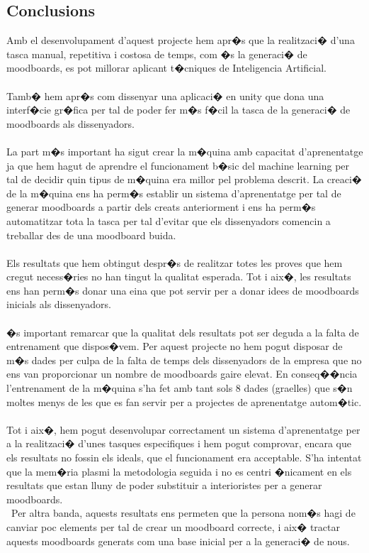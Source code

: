 \documentclass[12pt,a4paper,openright,oneside]{article}
\numberwithin{equation}{section}
\theoremstyle{definition}
\begin{document}
\subsection{Conclusions}
Amb el desenvolupament d'aquest projecte hem apr�s que la realitzaci� d'una tasca manual, repetitiva i costosa de temps, com �s la generaci� de moodboards, es pot millorar aplicant t�cniques de Inteligencia Artificial.\\\\
Tamb� hem apr�s com dissenyar una aplicaci� en unity que dona una interf�cie gr�fica per tal de poder fer m�s f�cil la tasca de la generaci� de moodboards als dissenyadors. \\\\
La part m�s important ha sigut crear la m�quina amb capacitat d'aprenentatge ja que hem hagut de aprendre el funcionament b�sic del machine learning per tal de decidir quin tipus de m�quina era millor pel problema descrit. La creaci� de la m�quina ens ha perm�s establir un sistema d'aprenentatge per tal de generar moodboards a partir dels creats anteriorment i ens ha perm�s automatitzar tota la tasca per tal d'evitar que els dissenyadors comencin a treballar des de una moodboard buida.\\\\
Els resultats que hem obtingut despr�s de realitzar totes les proves que hem cregut necess�ries no han tingut la qualitat esperada. Tot i aix�, les resultats ens han perm�s  donar una eina que pot servir per a donar idees de moodboards inicials als dissenyadors. 
\\\\
�s important remarcar que la qualitat dels resultats  pot ser deguda a la falta de entrenament que dispos�vem. Per aquest projecte no hem pogut disposar de m�s dades per culpa de la falta de temps dels dissenyadors de la empresa que no ens van proporcionar un nombre de moodboards  gaire elevat. En conseq��ncia  l'entrenament de la m�quina s'ha fet amb tant sols 8  dades (graelles) que s�n moltes menys de les que es fan servir per a projectes de aprenentatge autom�tic. \\\\
Tot i aix�, hem pogut desenvolupar correctament un sistema d'aprenentatge per a la realitzaci� d'unes tasques especifiques i hem pogut comprovar, encara que els resultats no fossin els ideals, que el funcionament era acceptable.  S'ha intentat que la mem�ria plasmi la metodologia seguida i no es centri �nicament en els resultats que estan lluny de poder substituir a interioristes per a generar moodboards. \\\ Per altra banda, aquests resultats ens permeten  que la persona nom�s hagi de canviar poc elements per tal de crear un moodboard correcte, i aix� tractar aquests moodboards generats com una base inicial per a la generaci� de nous.\\\\
\end{document}
